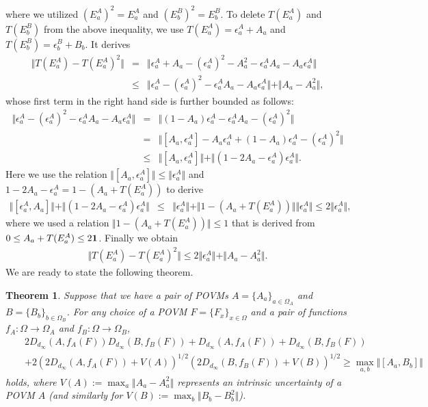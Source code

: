 \documentclass[12pt,showpacs,preprintnumbers,amsmath,amssymb]{revtex4-2}
\newtheorem{theorem}{Theorem}
\begin{document}
where we utilized $(E^A_a)^2=E^A_a$ and $(E^B_b)^2 =E^B_b$. 
To delete $T(E^A_a)$ and $T(E^B_b)$ from the above inequality, we use
$T(E^A_a)=\epsilon^A_a +A_a$ and $T(E^B_b)=\epsilon^B_b +B_b$. 
It derives
\begin{eqnarray*}
\Vert T(E^A_a)-T(E^A_a)^2 \Vert 
&=&\Vert \epsilon^A_a +A_a -(\epsilon^A_a)^2 -A_a^2
-\epsilon^A_a A_a -A_a \epsilon^A_a
\Vert
\\
&\leq&
\Vert \epsilon^A_a -(\epsilon^A_a)^2 -\epsilon^A_a A_a -A_a \epsilon^A_a 
\Vert 
+ \Vert A_a -A_a^2\Vert,
\end{eqnarray*}
whose first term in the right hand side 
is further bounded as follows:
\begin{eqnarray*}
\Vert \epsilon^A_a -(\epsilon^A_a)^2 -\epsilon^A_a A_a -A_a \epsilon^A_a 
\Vert 
&=&
\Vert (1-A_a)\epsilon^A_a -\epsilon^A_a A_a -(\epsilon^A_a)^2\Vert
\\
&=&
\Vert [A_a, \epsilon^A_a] -A_a \epsilon^A_a + (1-A_a)\epsilon^A_a -
(\epsilon^A_a)^2\Vert 
\\
&\leq &
\Vert [A_a,\epsilon^A_a]\Vert 
+\Vert (1-2A_a -\epsilon^A_a) \epsilon^A_a\Vert.
\end{eqnarray*}
Here we use the relation $\Vert [A_a, \epsilon^A_a]\Vert 
\leq \Vert \epsilon^A_a\Vert$ and $1-2A_a -\epsilon^A_a
=1-(A_a +T(E^A_a))$ to derive
\begin{eqnarray*}
\Vert [\epsilon^A_a, A_a]\Vert 
+\Vert (1-2A_a -\epsilon^A_a) \epsilon^A_a\Vert
&\leq& \Vert \epsilon^A_a \Vert 
+\Vert 1-(A_a +T(E^A_a))\Vert \Vert \epsilon^A_a\Vert
\leq
2 \Vert \epsilon^A_a\Vert, 
\end{eqnarray*}
where we used a relation $\Vert 1- (A_a +T(E^A_a))\Vert \leq 1$
that is derived from $0\leq A_a +T(E^A_a)\leq 2 {\bf 1}$.
Finally we obtain
\begin{eqnarray}
\Vert T(E^A_a)-T(E^A_a)^2 \Vert
\leq 2\Vert \epsilon^A_a\Vert +\Vert A_a-A_a^2\Vert.
\label{TAbound}
\end{eqnarray}
We are ready to state the following theorem.
\begin{theorem}\label{maintheorem}
Suppose that we have a pair of POVMs $A=\{A_a\}_{a\in \Omega_A}$ 
and $B=\{B_b\}_{b\in \Omega_B}$. For any choice of a POVM 
$F=\{F_x\}_{x\in \Omega}$ and a pair of functions 
$f_A: \Omega \to \Omega_A$ and $f_B: \Omega \to \Omega_B$, 
\begin{eqnarray*}
&&2 D_{d_{\infty}}(A, f_A(F))D_{d_{\infty}}(B, f_B(F))
+D_{d_{\infty}}(A,f_A(F))+D_{d_{\infty}}(B,f_B(F))
\\
&&
+2 (2D_{d_{\infty}}(A,f_A(F))+ V(A))^{1/2}(2D_{d_{\infty}}(B,f_B(F))
+V(B))^{1/2}\geq \max_{a,b}\Vert[A_a,B_b]\Vert
\end{eqnarray*}
holds, where $V(A):=\max_a\Vert A_a-A_a^2\Vert$ represents 
an intrinsic uncertainty of a POVM $A$ (and similarly for $V(B):=
\max_b \Vert B_b -B_b^2\Vert$). 
\end{theorem}
\end{document}
